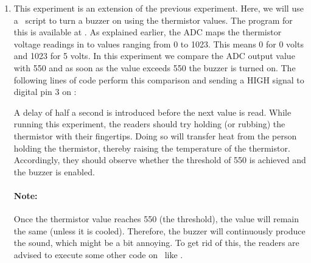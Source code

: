 \begin{enumerate}
  \item This experiment is an extension of the previous
        experiment. Here, we will use a \scilab\ script to
        turn a buzzer on using the thermistor values.
        The program for this is available at
        .  As explained earlier,
        the ADC maps the thermistor voltage readings in to values
        ranging from 0 to 1023. This means 0 for 0 volts and 1023 for 5
        volts. In this experiment we compare the ADC output value with 550
        and as soon as the value exceeds 550 the buzzer is turned on. The following lines of code perform this
        comparison and sending a {HIGH} signal to digital pin 3 on \arduino:
        
        A delay of half a second is introduced
        before the next value is read. While running this experiment,
        the readers should try holding (or rubbing) the thermistor with their fingertips.
        Doing so will transfer heat from the person holding the
        thermistor, thereby raising the temperature of the thermistor.
        Accordingly, they should observe whether the threshold of 550 is achieved
        and the buzzer is enabled.

        \paragraph{Note:} Once the thermistor value reaches 550 (the threshold), the value will remain the same
        (unless it is cooled). Therefore, the buzzer will continuously produce the sound, which might be
        a bit annoying. To get rid of this, the readers are advised to
        execute some other code on \arduino\ like .
\end{enumerate}


